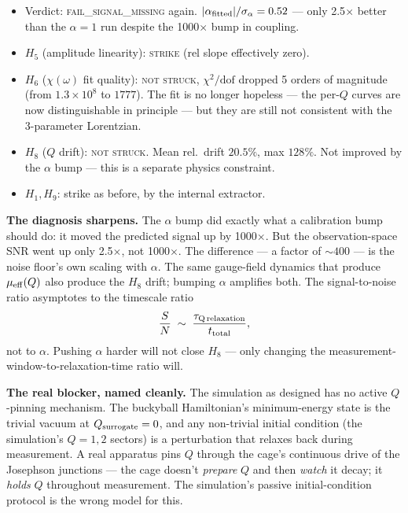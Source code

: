 \documentclass[12pt,a4paper]{article}
\theoremstyle{plain}
\theoremstyle{definition}
\theoremstyle{remark}
\begin{document}
\begin{itemize}
    \item Verdict: \textsc{fail\_signal\_missing} again. $|\alpha_{\rm fitted}|/\sigma_\alpha = 0.52$ --- only 2.5$\times$ better than the $\alpha=1$ run despite the 1000$\times$ bump in coupling.
    \item $H_5$ (amplitude linearity): \textsc{strike} (rel slope effectively zero).
    \item $H_6$ ($\chi(\omega)$ fit quality): \textsc{not struck}, $\chi^2/\mathrm{dof}$ dropped 5 orders of magnitude (from $1.3\times 10^8$ to $1777$). The fit is no longer hopeless --- the per-$Q$ curves are now distinguishable in principle --- but they are still not consistent with the 3-parameter Lorentzian.
    \item $H_8$ ($Q$ drift): \textsc{not struck}. Mean rel.\ drift $20.5\%$, max $128\%$. Not improved by the $\alpha$ bump --- this is a separate physics constraint.
    \item $H_1, H_9$: strike as before, by the internal extractor.
\end{itemize}

\textbf{The diagnosis sharpens.} The $\alpha$ bump did exactly what a calibration bump should do: it moved the predicted signal up by 1000$\times$. But the observation-space SNR went up only 2.5$\times$, not 1000$\times$. The difference --- a factor of $\sim 400$ --- is the noise floor's own scaling with $\alpha$. The same gauge-field dynamics that produce $\mu_{\rm eff}(Q)$ also produce the $H_8$ drift; bumping $\alpha$ amplifies both. The signal-to-noise ratio asymptotes to the timescale ratio
$$
\frac{S}{N} \;\sim\; \frac{\tau_{\rm Q\,relaxation}}{t_{\rm total}},
$$
not to $\alpha$. Pushing $\alpha$ harder will not close $H_8$ --- only changing the measurement-window-to-relaxation-time ratio will.

\textbf{The real blocker, named cleanly.} The simulation as designed has no active $Q$-pinning mechanism. The buckyball Hamiltonian's minimum-energy state is the trivial vacuum at $Q_{\rm surrogate}=0$, and any non-trivial initial condition (the simulation's $Q=1, 2$ sectors) is a perturbation that relaxes back during measurement. A real apparatus pins $Q$ through the cage's continuous drive of the Josephson junctions --- the cage doesn't \emph{prepare} $Q$ and then \emph{watch} it decay; it \emph{holds} $Q$ throughout measurement. The simulation's passive initial-condition protocol is the wrong model for this.
\end{document}
